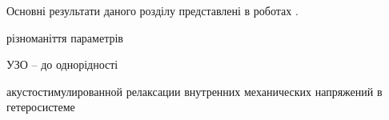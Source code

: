 \documentclass[a4paper,14pt,oneside,openany]{memoir}
\begin{document}
Основні результати даного розділу представлені в роботах \cite{Olikh:UPJ2014,OlikhJAP,Olikh:Ultras2016,Olikh2016JSem,
8Drog,2014IUSOl,2015ICU,7UNCPS}.







різноманіття параметрів
\cite{SBD:rizn}

УЗО -- до однорідності \cite{UST:SDErmol}

акустостимулированной релаксации внутренних механических напряжений в гетеросистеме \cite{BritunFTT}

%
%
%
%
%
%
%
%
%
%
\end{document}
